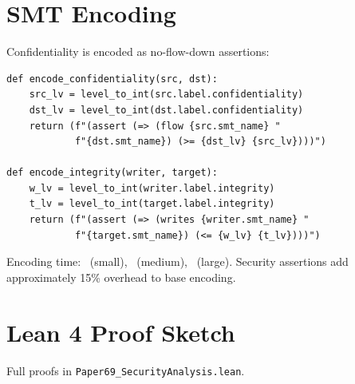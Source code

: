 \documentclass[11pt]{article}
\begin{document}
\section{SMT Encoding}\label{sec:verification}

Confidentiality is encoded as no-flow-down assertions:

\begin{lstlisting}[style=jugeo-python]
def encode_confidentiality(src, dst):
    src_lv = level_to_int(src.label.confidentiality)
    dst_lv = level_to_int(dst.label.confidentiality)
    return (f"(assert (=> (flow {src.smt_name} "
            f"{dst.smt_name}) (>= {dst_lv} {src_lv})))")

def encode_integrity(writer, target):
    w_lv = level_to_int(writer.label.integrity)
    t_lv = level_to_int(target.label.integrity)
    return (f"(assert (=> (writes {writer.smt_name} "
            f"{target.smt_name}) (<= {w_lv} {t_lv})))")
\end{lstlisting}

Encoding time: \subEncodeforsolverSmallTime\ (small),
\subEncodeforsolverMediumTime\ (medium),
\subEncodeforsolverLargeTime\ (large).  Security assertions add
approximately 15\% overhead to base encoding.

\section{Lean 4 Proof Sketch}\label{sec:lean-proof}

Full proofs in \texttt{Paper69\_SecurityAnalysis.lean}.
\end{document}
